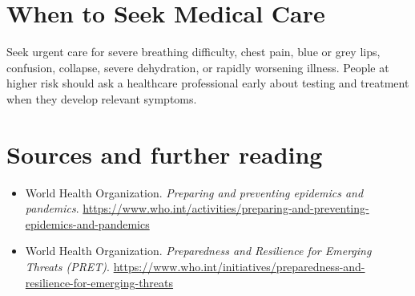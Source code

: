 \section*{When to Seek Medical Care}
Seek urgent care for severe breathing difficulty, chest pain, blue or grey lips, confusion, collapse, severe dehydration, or rapidly worsening illness. People at higher risk should ask a healthcare professional early about testing and treatment when they develop relevant symptoms.

\section*{Sources and further reading}
\begin{itemize}
\item World Health Organization. \textit{Preparing and preventing epidemics and pandemics}. \url{https://www.who.int/activities/preparing-and-preventing-epidemics-and-pandemics}
\item World Health Organization. \textit{Preparedness and Resilience for Emerging Threats (PRET)}. \url{https://www.who.int/initiatives/preparedness-and-resilience-for-emerging-threats}
\end{itemize}
